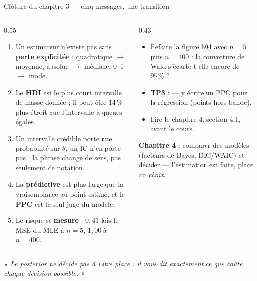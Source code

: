 \begin{frame}{Clôture du chapitre 3 --- cinq messages, une transition}
\footnotesize
\vspace{-2.5mm}
\begin{columns}[t]
\begin{column}{0.55\textwidth}
\begin{kbox}
\begin{enumerate}
  \item Un estimateur n'existe pas sans \textbf{perte explicitée} :
        quadratique $\to$ moyenne, absolue $\to$ médiane, 0--1 $\to$ mode.
  \item Le \textbf{HDI} est le plus court intervalle de masse donnée ; il peut
        être $14\,\%$ plus étroit que l'intervalle à queues égales.
  \item Un intervalle crédible porte une probabilité sur $\theta$, un IC n'en
        porte pas : la phrase change de sens, pas seulement de notation.
  \item La \textbf{prédictive} est plus large que la vraisemblance au point
        estimé, et le \textbf{PPC} est le seul juge du modèle.
  \item Le risque se \textbf{mesure} : $0{,}41$ fois le MSE du MLE à $n=5$,
        $1{,}00$ à $n=400$.
\end{enumerate}
\end{kbox}
\end{column}
\begin{column}{0.43\textwidth}
\begin{ebox}
\begin{itemize}
  \item Refaire la figure h04 avec $n = 5$ puis $n = 100$ : la couverture de
        Wald s'écarte-t-elle encore de $95\,\%$ ?
  \item \textbf{TP3} : 
        — y écrire un PPC pour la régression (points hors bande).
  \item Lire le chapitre 4, section 4.1, avant le cours.
\end{itemize}
\end{ebox}
\begin{tcolorbox}[colback=byCyan!8,colframe=byCyan,arc=2mm]
\centering\small
\textbf{Chapitre 4} : comparer des modèles (facteurs de Bayes, DIC/WAIC) et
décider --- l'estimation est faite, place au \emph{choix}.
\end{tcolorbox}
\end{column}
\end{columns}
\vspace{1mm}
\begin{center}
\small\itshape
« Le posterior ne décide pas à votre place : il vous dit exactement ce que coûte
chaque décision possible. »
\end{center}
\end{frame}
